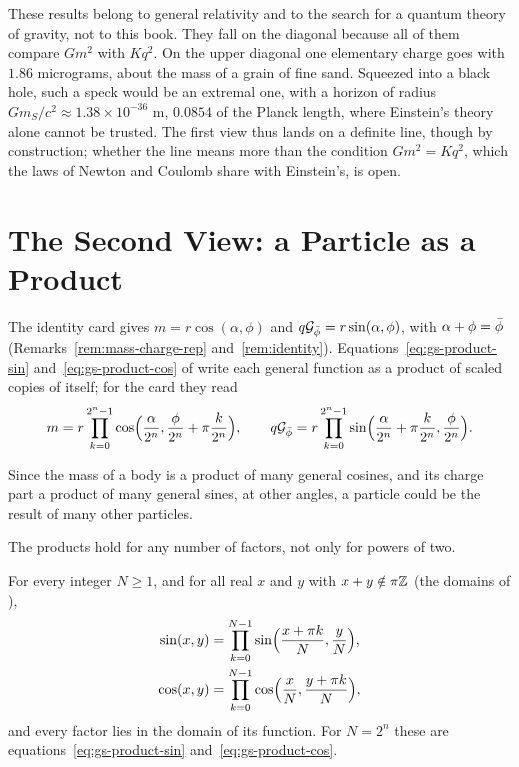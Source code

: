 These results belong to general relativity and to the search for a quantum theory of gravity, not to this book. They fall on the diagonal because all of them compare $G m^2$ with $K q^2$. On the upper diagonal one elementary charge goes with $1.86$ micrograms, about the mass of a grain of fine sand. Squeezed into a black hole, such a speck would be an extremal one, with a horizon of radius $G m_S/c^2 \approx 1.38 \times 10^{-36}$ m, $0.0854$ of the Planck length, where Einstein's theory alone cannot be trusted. The first view thus lands on a definite line, though by construction; whether the line means more than the condition $G m^2 = K q^2$, which the laws of Newton and Coulomb share with Einstein's, is open.

\section{The Second View: a Particle as a Product}\label{sec:op-second}

The identity card gives $m = r\cos(\alpha, \phi)$ and $q\mathcal{G}_{\bar{\phi}} = r\sin(\alpha, \phi)$, with $\alpha + \phi = \bar{\phi}$ (Remarks~\ref{rem:mass-charge-rep} and~\ref{rem:identity}). Equations~\eqref{eq:gs-product-sin} and~\eqref{eq:gs-product-cos} of  write each general function as a product of scaled copies of itself; for the card they read
\[
m = r\prod_{k=0}^{2^n - 1} \cos\Bigl(\frac{\alpha}{2^n}, \frac{\phi}{2^n} + \pi\frac{k}{2^n}\Bigr) , \qquad
q\mathcal{G}_{\bar{\phi}} = r\prod_{k=0}^{2^n - 1} \sin\Bigl(\frac{\alpha}{2^n} + \pi\frac{k}{2^n}, \frac{\phi}{2^n}\Bigr) .
\]

\begin{view}\label{view:op-products}
Since the mass of a body is a product of many general cosines, and its charge part a product of many general sines, at other angles, a particle could be the result of many other particles.
\end{view}

The products hold for any number of factors, not only for powers of two.

\begin{proposition}\label{prop:op-every-n}
For every integer $N \geq 1$, and for all real $x$ and $y$ with $x + y \notin \pi\mathbb{Z}$ (the domains of ),
\begin{align*}
\sin(x, y) &= \prod_{k=0}^{N-1} \sin\Bigl(\frac{x + \pi k}{N}, \frac{y}{N}\Bigr) , \\
\cos(x, y) &= \prod_{k=0}^{N-1} \cos\Bigl(\frac{x}{N}, \frac{y + \pi k}{N}\Bigr) ,
\end{align*}
and every factor lies in the domain of its function. For $N = 2^n$ these are equations~\eqref{eq:gs-product-sin} and~\eqref{eq:gs-product-cos}.
\end{proposition}

